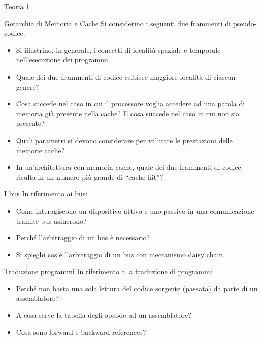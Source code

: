\begin{quiz}{Teoria 1}

\begin{essay}[points=7]{Gerarchia di Memoria e Cache}
Si considerino i seguenti due frammenti di pseudo-codice:


\begin{itemize}
\item Si illustrino, in generale, i concetti di località spaziale e temporale nell'esecuzione dei programmi.
\item Quale dei due frammenti di codice esibisce maggiore località di ciascun genere?
\item Cosa succede nel caso in cui il processore voglia accedere ad una parola di memoria gi\`{a} presente nella cache? E cosa succede nel caso in cui non sia presente?
\item Quali parametri si devono considerare per valutare le prestazioni delle memorie cache?
\item In un'architettura con memoria cache, quale dei due frammenti di codice risulta in un numero più grande di ``cache hit''?
\end{itemize}

\end{essay}


\begin{essay}[points=7]{I bus}
In riferimento ai bus:
\begin{itemize}
\item Come interagiscono un dispositivo attivo e uno passivo in una comunicazione tramite bus asincrono?
\item Perch\'{e} l'arbitraggio di un bus \`{e} necessario?
\item Si spieghi cos'\`e l'arbitraggio di un bus con meccanismo daisy chain.
\end{itemize}
\end{essay}

\begin{essay}[points=7]{Traduzione programmi}
In riferimento alla traduzione di programmi:
\begin{itemize}
\item Perché non basta una sola lettura del codice sorgente (passata) da parte di un assemblatore?
\item A cosa serve la tabella degli opcode ad un assemblatore?
\item Cosa sono forward e backward references?
\end{itemize}
\end{essay}


\end{quiz}
